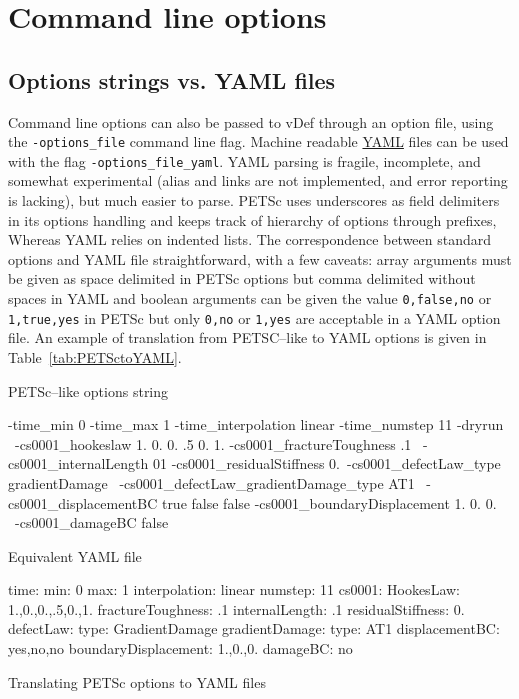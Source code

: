 \documentclass[10pt,oneside]{memoir}
\begin{document}
\chapter{Command line options}


\section{Options strings vs. YAML files}
Command line options can also be passed to vDef through an option file, using the \verb+-options_file+ command line flag. Machine readable \href{http://www.yaml.org}{YAML} files can be used with the flag \verb+-options_file_yaml+. YAML parsing is fragile, incomplete, and somewhat experimental (alias and links are not implemented, and error reporting is lacking), but much easier to parse. PETSc  uses  underscores as field delimiters in its options handling and keeps track of hierarchy of options through prefixes, Whereas YAML relies on indented lists. The correspondence between standard options and YAML file straightforward, with a few caveats: array arguments must be given as space delimited in PETSc options but comma delimited without spaces in YAML and boolean arguments can be given the value \verb+0,false,no+ or \verb+1,true,yes+ in PETSc but only \verb+0,no+ or \verb+1,yes+ are acceptable in a YAML option file. An example of translation from PETSC--like to YAML options is given in Table~\ref{tab:PETSctoYAML}.

\begin{table}
PETSc--like options string\\
\small{
\begin{boxedverbatim}
-time_min 0 -time_max 1 -time_interpolation linear -time_numstep 11  -dryrun \
-cs0001_hookeslaw 1. 0. 0. .5 0. 1. -cs0001_fractureToughness .1 \
-cs0001_internalLength 01 -cs0001_residualStiffness 0.\
-cs0001_defectLaw_type gradientDamage \
-cs0001_defectLaw_gradientDamage_type AT1 \
-cs0001_displacementBC true false false -cs0001_boundaryDisplacement 1. 0. 0. \
-cs0001_damageBC false
\end{boxedverbatim}
}
Equivalent YAML file\\
\small{
\begin{boxedverbatim}
time:
    min: 0
    max: 1
    interpolation: linear
    numstep: 11
cs0001:
    HookesLaw: 1.,0.,0.,.5,0.,1.
    fractureToughness: .1
    internalLength: .1
    residualStiffness: 0.
    defectLaw:
        type: GradientDamage
        gradientDamage:
            type: AT1
    displacementBC: yes,no,no
    boundaryDisplacement: 1.,0.,0.
    damageBC: no
\end{boxedverbatim}
}
\caption{Translating PETSc options to YAML files}
\label{tab:PETSctoYAML}
\end{table}
\end{document}
